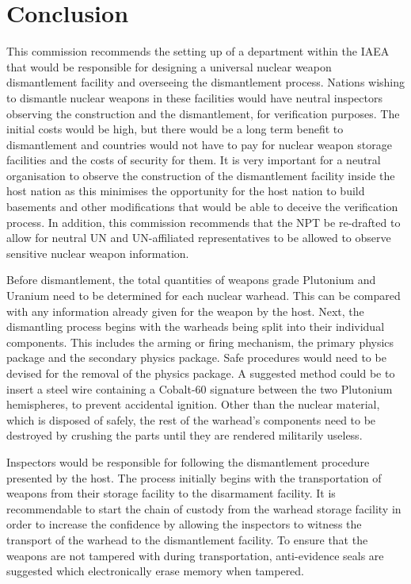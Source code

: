 \documentclass[twoside,titlepage,11pt,twocolumn,a4paper]{article}
\begin{document}
\section{Conclusion}
This commission recommends the setting up of a department within the
IAEA that would be responsible for designing a universal nuclear
weapon dismantlement facility and overseeing the dismantlement
process. Nations wishing to dismantle nuclear weapons in these
facilities would have neutral inspectors observing the construction
and the dismantlement, for verification purposes. The initial costs
would be high, but there would be a long term benefit to dismantlement
and countries would not have to pay for nuclear weapon storage
facilities and the costs of security for them. It is very important
for a neutral organisation to observe the construction of the
dismantlement facility inside the host nation as this minimises the
opportunity for the host nation to build basements and other
modifications that would be able to deceive the verification
process. In addition, this commission recommends that the NPT be
re-drafted to allow for neutral UN and UN-affiliated representatives
to be allowed to observe sensitive nuclear weapon information.

Before dismantlement, the total quantities of weapons grade Plutonium
and Uranium need to be determined for each nuclear warhead. This can
be compared with any information already given for the weapon by the
host. Next, the dismantling process begins with the warheads being
split into their individual components. This includes the arming or
firing mechanism, the primary physics package and the secondary
physics package. Safe procedures would need to be devised for the
removal of the physics package. A suggested method could be to insert
a steel wire containing a Cobalt-60 signature between the two
Plutonium hemispheres, to prevent accidental ignition. Other than the
nuclear material, which is disposed of safely, the rest of the
warhead’s components need to be destroyed by crushing the parts until
they are rendered militarily useless.

Inspectors would be responsible for following the dismantlement
procedure presented by the host. The process initially begins with the
transportation of weapons from their storage facility to the
disarmament facility. It is recommendable to start the chain of
custody from the warhead storage facility in order to increase the
confidence by allowing the inspectors to witness the transport of the
warhead to the dismantlement facility. To ensure that the weapons are
not tampered with during transportation, anti-evidence seals are
suggested which electronically erase memory when tampered.
\end{document}
